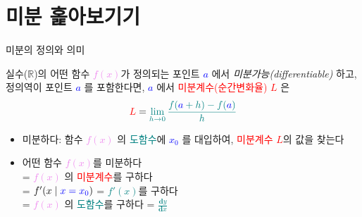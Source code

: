 \documentclass[aspectratio=169]{beamer}
\begin{document}
\section{미분 홅아보기기}
\begin{frame}{미분의 정의와 의미}
  \begin{definition}[도함수]
    실수($\mathbb{R}$)의 어떤 함수 \textcolor{violet}{$f(x)$}가 정의되는 포인트 \textcolor{blue}{\emph{$a$}} 에서 \emph{미분가능(differentiable)} 하고, 정의역이 포인트 \textcolor{blue}{\emph{$a$}} 를 포함한다면, \textcolor{blue}{\emph{$a$}} 에서 \textcolor{red}{미분계수(순간변화율)} \textcolor{red}{\emph{$L$}} 은 \\
    \begin{equation}
      \textcolor{red}{L} = \textcolor{teal}{\lim_{h \to 0} \frac{f(\textcolor{blue}{a}+h)-f(\textcolor{blue}{a})}{h}}
    \end{equation}
  \end{definition}
  \begin{itemize}
    \item 미분하다: 함수 \textcolor{violet}{$f(x)$} 의 \textcolor{teal}{도함수}에 \textcolor{blue}{\emph{$x_0$}} 를 대입하여, \textcolor{red}{미분계수 $L$}의 값을 찾는다
    \item 어떤 함수 \textcolor{violet}{$f(x)$}를 미분하다 \\
    = \textcolor{violet}{$f(x)$} 의 \textcolor{red}{미분계수}를 구하다 \\
    = \textcolor{teal}{$f'(x \mid \textcolor{blue}{x = x_0})$}
    = \textcolor{teal}{$f'(x)$}를 구하다 \\
    = \textcolor{violet}{$f(x)$} 의 \textcolor{teal}{도함수}를 구하다 
    = \textcolor{teal}{$\frac{\mathbf{d}y}{\mathbf{d}x}$}
  \end{itemize}
\end{frame}
\end{document}
